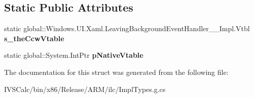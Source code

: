 \subsection*{Static Public Attributes}
\begin{DoxyCompactItemize}
\item 
\mbox{\label{struct_windows_1_1_u_i_1_1_xaml_1_1_leaving_background_event_handler_____impl_1_1_vtbl_a01750cd706fbbc75a1544fdf8f5bb1d8}} 
static global\+::\+Windows.\+U\+I.\+Xaml.\+Leaving\+Background\+Event\+Handler\+\_\+\+\_\+\+Impl.\+Vtbl {\bfseries s\+\_\+the\+Ccw\+Vtable}
\item 
\mbox{\label{struct_windows_1_1_u_i_1_1_xaml_1_1_leaving_background_event_handler_____impl_1_1_vtbl_a464b811435604371bc297402c431b1ae}} 
static global\+::\+System.\+Int\+Ptr {\bfseries p\+Native\+Vtable}
\end{DoxyCompactItemize}


The documentation for this struct was generated from the following file\+:\begin{DoxyCompactItemize}
\item 
I\+V\+S\+Calc/bin/x86/\+Release/\+A\+R\+M/ilc/Impl\+Types.\+g.\+cs\end{DoxyCompactItemize}
